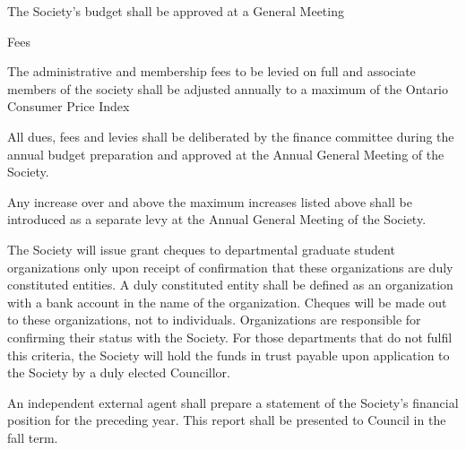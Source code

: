 \begin{longenum}[ label*=\thesection.\arabic*., align=left]
    \item The Society's budget shall be approved at a General Meeting
    \item Fees
    \begin{longenum}[ label*=\arabic*., align=left]
		\item The administrative and membership fees to be levied on full and associate members of the society shall be adjusted annually to a maximum of the Ontario Consumer Price Index
        
        \item All dues, fees and levies shall be deliberated by the finance committee
during the annual budget preparation and approved at the Annual General Meeting of the
Society.

		\item Any increase over and above the maximum increases listed above shall be introduced as a separate levy at the Annual General Meeting of the Society.
        
        
	\end{longenum}
    \item The Society will issue grant cheques to departmental graduate student organizations only upon receipt of confirmation that these organizations are duly constituted entities. A duly constituted entity shall be defined as an organization with a bank account in the name of the organization. Cheques will be made out to these organizations, not to individuals. Organizations are responsible for confirming their status with the Society. For those departments that do not fulfil this criteria, the Society will hold the funds in trust payable upon application to the Society by a duly elected Councillor.
    \item An independent external agent shall prepare a statement of the Society's financial position for the preceding year. This report shall be presented to Council in the fall term.
\end{longenum}
\newpage



